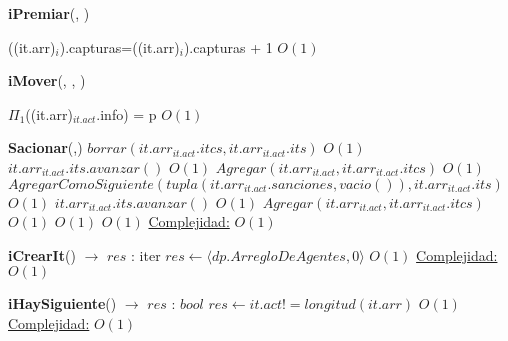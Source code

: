    \begin{algorithm}[H]{\textbf{iPremiar}(, )}
        \begin{algorithmic}
				\State ((it.arr)$_{i}$).capturas=((it.arr)$_{i}$).capturas + 1 \Comment $O(1)$
        \end{algorithmic}
    \end{algorithm}
	\begin{algorithm}[H]{\textbf{iMover}(, , )}
		\begin{algorithmic}
			\State $\Pi_{1}$((it.arr)$_{it.act}$.info) = p $O(1)$
       	\end{algorithmic}
	\end{algorithm}
    \begin{algorithm}[H]
        \begin{algorithmic}[1]
            \State \textbf{Sacionar}(,)
            \State $borrar(it.arr_{it.act}.itcs,it.arr_{it.act}.its)$ \Comment $O(1)$
				\State $it.arr_{it.act}.its.avanzar()$ \Comment $O(1)$
                \State $Agregar(it.arr_{it.act},it.arr_{it.act}.itcs)$ \Comment $O(1)$
            \Else
				\State $AgregarComoSiguiente(tupla(it.arr_{it.act}.sanciones,vacio()),it.arr_{it.act}.its)$ \Comment $O(1)$
				\State $it.arr_{it.act}.its.avanzar()$ \Comment $O(1)$
                \State $Agregar(it.arr_{it.act},it.arr_{it.act}.itcs)$ \Comment $O(1)$
            \EndIf
			\State \Comment $O(1)$
            \State \Comment $O(1)$
			\Statex \underline{Complejidad:} $O(1)$
        \end{algorithmic}
    \end{algorithm}
    \begin{algorithm}[H]
        \begin{algorithmic}[1]
            \State \textbf{iCrearIt}() $\to$ $res$ : iter
            \State $res \gets \langle dp.ArregloDeAgentes,0 \rangle$ 	\Comment $O(1)$
            \Statex \underline{Complejidad:} $O(1)$
        \end{algorithmic}
    \end{algorithm}	
    \begin{algorithm}[H]
        \begin{algorithmic}[1]
            \State \textbf{iHaySiguiente}() $\to$ $res$ : $bool$
            \State $res \gets it.act != longitud(it.arr)$	\Comment $O(1)$
            \Statex \underline{Complejidad:} $O(1)$
        \end{algorithmic}
    \end{algorithm}
